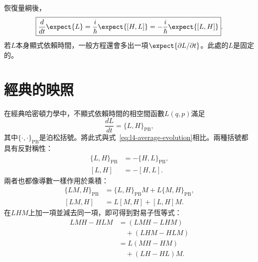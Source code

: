 恢復量綱後，
\begin{equation}
\boxed{\frac{d}{dt}\expect{L}
=\frac{i}{\hbar}\expect{[H,L]}
=-\frac{i}{\hbar}\expect{[L,H]}}.
\label{eq:l4-average-evolution}
\end{equation}
若\(L\)本身顯式依賴時間，一般方程還會多出一項\(\expect{\partial L/\partial t}\)。此處的\(L\)是固定的。

\begin{classroomqa}
\end{classroomqa}

\begin{classroomqa}
\end{classroomqa}

\section{經典的映照}

在經典哈密頓力學中，不顯式依賴時間的相空間函數\(L(q,p)\)滿足
\begin{equation}
\frac{dL}{dt}=\{L,H\}_{\mathrm{PB}},
\label{eq:l4-poisson-evolution}
\end{equation}
其中\(\{\cdot,\cdot\}_{\mathrm{PB}}\)是泊松括號。將此式與式~\eqref{eq:l4-average-evolution}相比。兩種括號都具有反對稱性：
\begin{align}
\{L,H\}_{\mathrm{PB}}&=-\{H,L\}_{\mathrm{PB}},\\
[L,H]&=-[H,L].
\end{align}
兩者也都像導數一樣作用於乘積：
\begin{align}
\{LM,H\}_{\mathrm{PB}}
&=\{L,H\}_{\mathrm{PB}}M+L\{M,H\}_{\mathrm{PB}},\\
[LM,H]
&=L[M,H]+[L,H]M.
\label{eq:l4-commutator-product}
\end{align}
在\(LHM\)上加一項並減去同一項，即可得到對易子恆等式：
\begin{align}
LMH-HLM
&=(LMH-LHM)\\
&\quad +(LHM-HLM)\\
&=L(MH-HM)\\
&\quad +(LH-HL)M.
\end{align}


